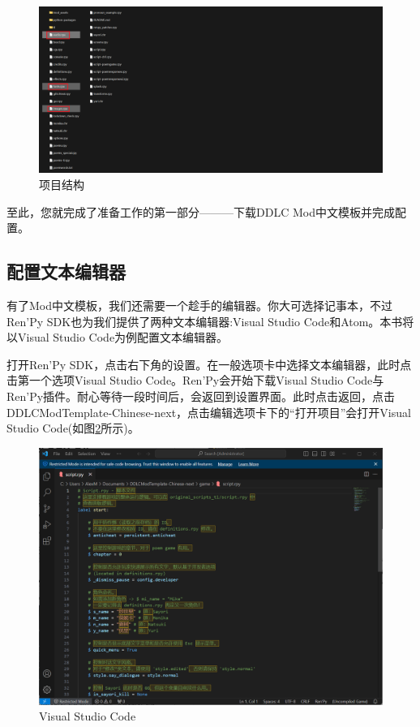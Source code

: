 \begin{figure}[htbp]
    \centering
    \includegraphics[scale=.2]{Pictures/2/2.1/2.1.2}
    \caption{项目结构}
    \label{fig:3.1.1.2}
\end{figure}

至此，您就完成了准备工作的第一部分———下载DDLC Mod中文模板并完成配置。

\subsection{配置文本编辑器}
有了Mod中文模板，我们还需要一个趁手的编辑器。你大可选择记事本，不过Ren'Py SDK也为我们提供了两种文本编辑器:Visual Studio Code和Atom。本书将以Visual Studio Code为例配置文本编辑器。

打开Ren'Py SDK，点击右下角的设置。在一般选项卡中选择文本编辑器，此时点击第一个选项Visual Studio Code。Ren'Py会开始下载Visual Studio Code与Ren'Py插件。耐心等待一段时间后，会返回到设置界面。此时点击返回，点击DDLCModTemplate-Chinese-next，点击编辑选项卡下的“打开项目”会打开Visual Studio Code(如图\ref{fig:3.1.2.1}所示)。

\begin{figure}[htbp]
    \centering
    \includegraphics[scale=.4]{Pictures/2/2.1/2.1.3}
    \caption{Visual Studio Code}
    \label{fig:3.1.2.1}
\end{figure}

